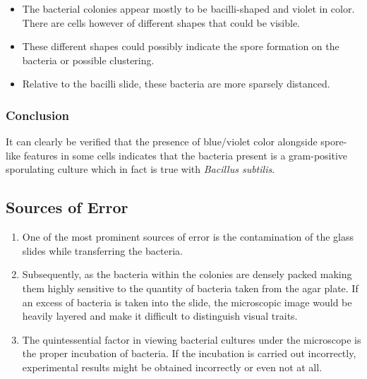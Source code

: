 \documentclass[pdflatex,sn-mathphys]{sn-jnl}%
\theoremstyle{thmstyleone}%
\theoremstyle{thmstyletwo}%
\theoremstyle{thmstylethree}%
\begin{document}
\begin{itemize}
  \item The bacterial colonies appear mostly to be bacilli-shaped and violet in color.
        There are cells however of different shapes that could be visible.
  \item These different shapes could possibly indicate the spore formation on the
        bacteria or possible clustering.
  \item Relative to the bacilli slide, these bacteria are more sparsely distanced.
\end{itemize}

\subsubsection{Conclusion}
It can clearly be verified that the presence of blue/violet color alongside
spore-like features in some cells indicates that the bacteria present is a
gram-positive sporulating culture which in fact is true with \textit{Bacillus
  subtilis}.

\subsection{Sources of Error}\label{subsec:errors}
\begin{enumerate}
  \item One of the most prominent sources of error is the contamination of the glass
        slides while transferring the bacteria.
  \item Subsequently, as the bacteria within the colonies are densely packed making
        them highly sensitive to the quantity of bacteria taken from the agar plate. If
        an excess of bacteria is taken into the slide, the microscopic image would be
        heavily layered and make it difficult to distinguish visual traits.
  \item The quintessential factor in viewing bacterial cultures under the microscope is
        the proper incubation of bacteria. If the incubation is carried out
        incorrectly, experimental results might be obtained incorrectly or even not at
        all.
\end{enumerate}
\end{document}
